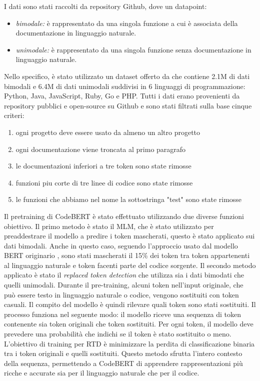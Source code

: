 \documentclass[../../Thesis.tex]{subfiles}
\begin{document}
I dati sono stati raccolti da repository Github, dove un datapoint:
\begin{itemize}
    \item \emph{bimodale:} è rappresentato da una singola funzione a cui è associata della documentazione in linguaggio naturale.
    \item \emph{unimodale:} è rappresentato da una singola funzione senza documentazione in 
    linguaggio naturale.
\end{itemize}
Nello specifico, è stato utilizzato un dataset offerto da \cite{CodeBERTDataset} che contiene 2.1M di dati bimodali e 6.4M di dati unimodali suddivisi in 6 linguaggi di programmazione: Python, Java, JavaScript, Ruby, Go e PHP. Tutti i dati erano provenienti da repository pubblici e open-source su Github e sono stati filtrati sulla base cinque criteri:
\begin{enumerate}
    \item ogni progetto deve essere usato da almeno un altro progetto 
    \item ogni documentazione viene troncata al primo paragrafo
    \item le documentazioni inferiori a tre token sono state rimosse
    \item funzioni piu corte di tre linee di codice sono state rimosse
    \item le funzioni che abbiamo nel nome la sottostringa "test" sono state rimosse
\end{enumerate}
Il pretraining di CodeBERT è stato effettuato utilizzando due diverse funzioni obiettivo. Il primo metodo è stato il MLM, che è stato utilizzato per preaddestrare il modello a predire i token mascherati, questo è stato applicato sui dati bimodali. Anche in questo caso, seguendo l'approccio usato dal modello BERT originario \cite{BERT},  sono stati mascherati il 15\% dei token tra token appartenenti al linguaggio naturale e token facenti parte del codice sorgente. Il secondo metodo applicato è stato il \emph{replaced token detection} che utilizza sia i dati bimodati che quelli unimodali.  Durante il pre-training, alcuni token nell'input originale, che può essere testo in linguaggio naturale o codice, vengono sostituiti con token casuali. Il compito del modello è quindi rilevare quali token sono stati sostituiti. Il processo funziona nel seguente modo: il modello riceve una sequenza di token contenente sia token originali che token sostituiti. Per ogni token, il modello deve prevedere una probabilità che indichi se il token è stato sostituito o meno. L'obiettivo di training per RTD è minimizzare la perdita di classificazione binaria tra i token originali e quelli sostituiti. Questo metodo sfrutta l'intero contesto della sequenza, permettendo a CodeBERT di apprendere rappresentazioni più ricche e accurate sia per il linguaggio naturale che per il codice.
\end{document}
